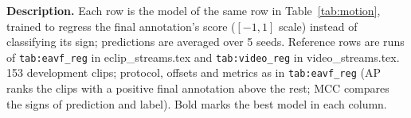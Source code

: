 \documentclass[11pt]{article}
\newcommand{\code}[1]{\texttt{#1}}
\newcommand{\tabledesc}[1]{\par\medskip\begin{minipage}{\linewidth}\footnotesize\textbf{Description.} #1\end{minipage}}
\begin{document}
\begin{table}[!htbp]
{\begin{tabular}{cccccccclccccccccccc}
\bottomrule
\end{tabular}%
}
\tabledesc{Each row is the model of the same row in Table~\ref{tab:motion}, trained to regress the final annotation's score ($[-1, 1]$ scale) instead of classifying its sign; predictions are averaged over 5 seeds. Reference rows are runs of \code{tab:eavf\_reg} in eclip\_streams.tex and \code{tab:video\_reg} in video\_streams.tex. 153 development clips; protocol, offsets and metrics as in \code{tab:eavf\_reg} (AP ranks the clips with a positive final annotation above the rest; MCC compares the signs of prediction and label). Bold marks the best model in each column.}
\end{table}
\end{document}
